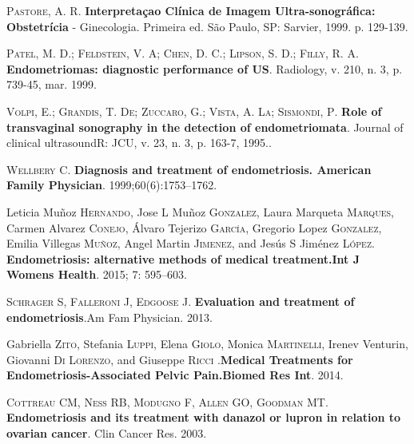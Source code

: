 \documentclass[12pt]{article} %
\begin{document}
\vspace{0,5cm}

\textsc{Pastore, A. R}.\textbf{ Interpretaçao Clínica de Imagem Ultra-sonográfica: Obstetrícia} - Ginecologia. Primeira ed. São Paulo, SP: Sarvier, 1999. p. 129-139.

\vspace{0,5cm}

\textsc{Patel, M. D.; Feldstein, V. A; Chen, D. C.; Lipson, S. D.; Filly, R. A}. \textbf{Endometriomas: diagnostic performance of US}. Radiology, v. 210, n. 3, p. 739-45, mar. 1999.

\vspace{0,5cm}

\textsc{Volpi, E.; Grandis, T. De; Zuccaro, G.; Vista, A. La; Sismondi, P}.\textbf{ Role of transvaginal sonography in the detection of endometriomata}. Journal of clinical ultrasoundR: JCU, v. 23, n. 3, p. 163-7, 1995..  

\vspace{0,5cm}

\textsc{Wellbery C}.\textbf{ Diagnosis and treatment of endometriosis. American Family Physician}. 1999;60(6):1753–1762.

\vspace{0,5cm}

Leticia Muñoz \textsc{Hernando}, Jose L Muñoz \textsc{Gonzalez}, Laura Marqueta \textsc{Marques}, Carmen Alvarez \textsc{Conejo}, Álvaro Tejerizo \textsc{García}, Gregorio Lopez \textsc{Gonzalez}, Emilia Villegas \textsc{Muñoz}, Angel Martin \textsc{Jimenez}, and Jesús S Jiménez \textsc{López}. \textbf{Endometriosis: alternative methods of medical treatment.Int J Womens Health}. 2015; 7: 595–603. 

\vspace{0,5cm}

\textsc{Schrager S, Falleroni J, Edgoose J}.\textbf{ Evaluation and treatment of endometriosis}.Am Fam Physician. 2013.

\vspace{0,5cm}

Gabriella\textsc{ Zito}, Stefania \textsc{Luppi}, Elena \textsc{Giolo}, Monica \textsc{Martinelli}, Irenev{ Venturin}, Giovanni \textsc{Di Lorenzo}, and Giuseppe \textsc{Ricci} .\textbf{Medical Treatments for Endometriosis-Associated Pelvic Pain.Biomed Res Int}. 2014.

\vspace{0,5cm}

\textsc{Cottreau CM, Ness RB, Modugno F, Allen GO, Goodman MT}. \textbf{Endometriosis and its treatment with danazol or lupron in relation to ovarian cancer}. Clin Cancer Res. 2003.
\end{document}

